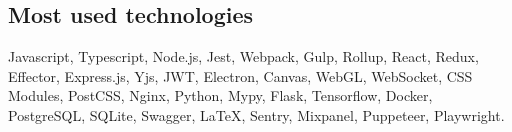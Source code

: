 \documentclass{vitonsky}
\begin{document}
\subsection*{Most used technologies}

Javascript, Typescript, Node.js, Jest, Webpack, Gulp, Rollup,
React, Redux, Effector, Express.js, Yjs, JWT, Electron, Canvas, WebGL, WebSocket, CSS Modules, PostCSS,
Nginx, Python, Mypy, Flask, Tensorflow, Docker, PostgreSQL, SQLite, Swagger, LaTeX,
Sentry, Mixpanel, Puppeteer, Playwright.
\end{document}
